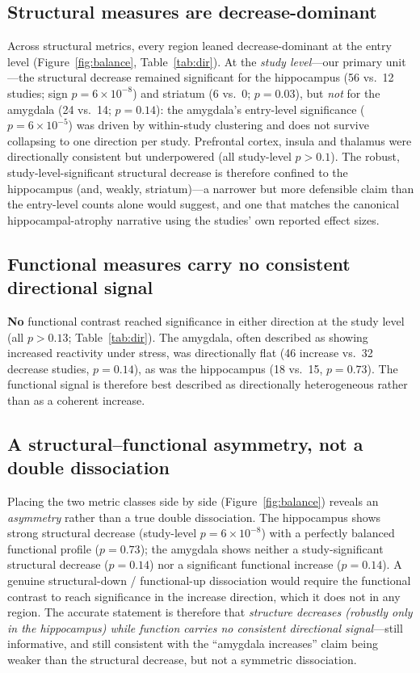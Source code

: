 \documentclass[11pt]{article}
\begin{document}
\subsection{Structural measures are decrease-dominant}
Across structural metrics, every region leaned decrease-dominant at the entry
level (Figure~\ref{fig:balance}, Table~\ref{tab:dir}). At the
\emph{study level}---our primary unit---the structural decrease remained
significant for the hippocampus (56 vs.\ 12 studies; sign $p=6\times10^{-8}$) and
striatum (6 vs.\ 0; $p=0.03$), but \emph{not} for the amygdala (24 vs.\ 14;
$p=0.14$): the amygdala's entry-level significance ($p=6\times10^{-5}$) was driven
by within-study clustering and does not survive collapsing to one direction per
study. Prefrontal cortex, insula and thalamus were directionally consistent but
underpowered (all study-level $p>0.1$). The robust, study-level-significant
structural decrease is therefore confined to the hippocampus (and, weakly,
striatum)---a narrower but more defensible claim than the entry-level counts
alone would suggest, and one that matches the canonical hippocampal-atrophy
narrative using the studies' own reported effect sizes.

\subsection{Functional measures carry no consistent directional signal}
\textbf{No} functional contrast reached significance in either direction at the
study level (all $p>0.13$; Table~\ref{tab:dir}). The amygdala, often described as
showing increased reactivity under stress, was directionally flat (46 increase
vs.\ 32 decrease studies, $p=0.14$), as was the hippocampus (18 vs.\ 15,
$p=0.73$). The functional signal is therefore best described as directionally
heterogeneous rather than as a coherent increase.

\subsection{A structural--functional asymmetry, not a double dissociation}
Placing the two metric classes side by side (Figure~\ref{fig:balance}) reveals an
\emph{asymmetry} rather than a true double dissociation. The hippocampus shows
strong structural decrease (study-level $p=6\times10^{-8}$) with a perfectly
balanced functional profile ($p=0.73$); the amygdala shows neither a
study-significant structural decrease ($p=0.14$) nor a significant functional
increase ($p=0.14$). A genuine structural-down / functional-up dissociation would
require the functional contrast to reach significance in the increase direction,
which it does not in any region. The accurate statement is therefore that
\emph{structure decreases (robustly only in the hippocampus) while function
carries no consistent directional signal}---still informative, and still
consistent with the ``amygdala increases'' claim being weaker than the structural
decrease, but not a symmetric dissociation.
\end{document}
